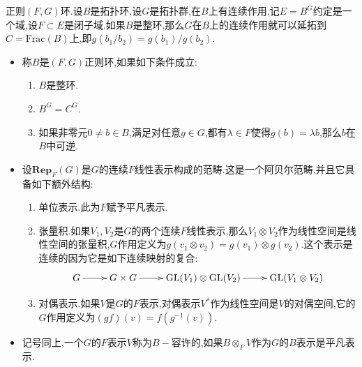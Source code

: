 正则$(F,G)$环.设$B$是拓扑环,设$G$是拓扑群,在$B$上有连续作用,记$E=B^G$约定是一个域,设$F\subset E$是闭子域.如果$B$是整环,那么$G$在$B$上的连续作用就可以延拓到$C=\mathrm{Frac}(B)$上,即$g(b_1/b_2)=g(b_1)/g(b_2)$.
\begin{itemize}
	\item 称$B$是$(F,G)$正则环,如果如下条件成立:
	\begin{enumerate}
		\item $B$是整环.
		\item $B^G=C^G$.
		\item 如果非零元$0\not=b\in B$,满足对任意$g\in G$,都有$\lambda\in F$使得$g(b)=\lambda b$,那么$b$在$B$中可逆.
	\end{enumerate}
	\item 设$\textbf{Rep}_F(G)$是$G$的连续$F$线性表示构成的范畴.这是一个阿贝尔范畴,并且它具备如下额外结构:
	\begin{enumerate}
		\item 单位表示.此为$F$赋予平凡表示.
		\item 张量积.如果$V_1,V_2$是$G$的两个连续$F$线性表示,那么$V_1\otimes V_2$作为线性空间是线性空间的张量积,$G$作用定义为$g(v_1\otimes v_2)=g(v_1)\otimes g(v_2)$.这个表示是连续的因为它是如下连续映射的复合:
		$$\xymatrix{G\ar[r]&G\times G\ar[r]&\mathrm{GL}(V_1)\otimes\mathrm{GL}(V_2)\ar[r]&\mathrm{GL}(V_1\otimes V_2)}$$
		\item 对偶表示.如果$V$是$G$的$F$表示,对偶表示$V^*$作为线性空间是$V$的对偶空间,它的$G$作用定义为$(gf)(v)=f(g^{-1}(v))$.
	\end{enumerate}
	\item 记号同上,一个$G$的$F$表示$V$称为$B-$容许的,如果$B\otimes_FV$作为$G$的$B$表示是平凡表示.
\end{itemize}

